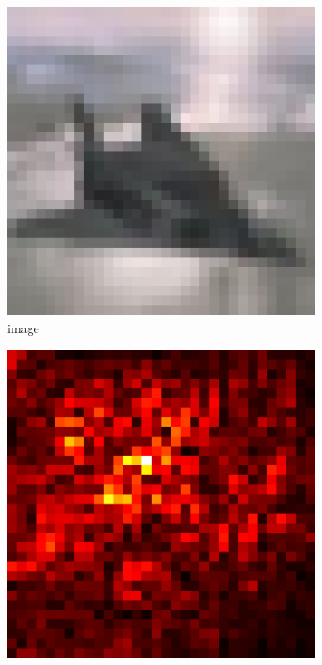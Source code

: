 \documentclass[preprint,12pt]{elsarticle}
\begin{document}
\begin{figure}
    \centering
    \begin{subfigure}{0.14\linewidth}
        \centering
        \includegraphics[width=\linewidth]{../visualizations/examples/cifar10/cnn/images/0.png}
        \caption{image}
    \end{subfigure}
    \hfill
    \begin{subfigure}{0.14\linewidth}
        \centering
        \includegraphics[width=\linewidth]{../visualizations/examples/cifar10/cnn/saliency_map/0.png}

\end{subfigure}
\end{figure}
\end{document}
